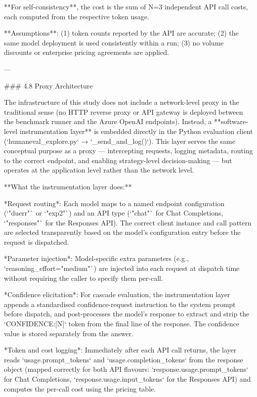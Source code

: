 **For self-consistency**, the cost is the sum of N=3 independent API call costs, each computed from the respective token usage.

**Assumptions**: (1) token counts reported by the API are accurate; (2) the same model deployment is used consistently within a run; (3) no volume discounts or enterprise pricing agreements are applied.

---

### 4.8 Proxy Architecture

The infrastructure of this study does not include a network-level proxy in the traditional sense (no HTTP reverse proxy or API gateway is deployed between the benchmark runner and the Azure OpenAI endpoints). Instead, a **software-level instrumentation layer** is embedded directly in the Python evaluation client (`humaneval_explore.py` → `_send_and_log()`). This layer serves the same conceptual purpose as a proxy — intercepting requests, logging metadata, routing to the correct endpoint, and enabling strategy-level decision-making — but operates at the application level rather than the network level.

**What the instrumentation layer does:**

*Request routing*: Each model maps to a named endpoint configuration (`"duerr"` or `"exp2"`) and an API type (`"chat"` for Chat Completions, `"responses"` for the Responses API). The correct client instance and call pattern are selected transparently based on the model's configuration entry before the request is dispatched.

*Parameter injection*: Model-specific extra parameters (e.g., `reasoning_effort="medium"`) are injected into each request at dispatch time without requiring the caller to specify them per-call.

*Confidence elicitation*: For cascade evaluation, the instrumentation layer appends a standardised confidence-request instruction to the system prompt before dispatch, and post-processes the model's response to extract and strip the `CONFIDENCE:[N]` token from the final line of the response. The confidence value is stored separately from the answer.

*Token and cost logging*: Immediately after each API call returns, the layer reads `usage.prompt_tokens` and `usage.completion_tokens` from the response object (mapped correctly for both API flavours: `response.usage.prompt_tokens` for Chat Completions, `response.usage.input_tokens` for the Responses API) and computes the per-call cost using the pricing table.

